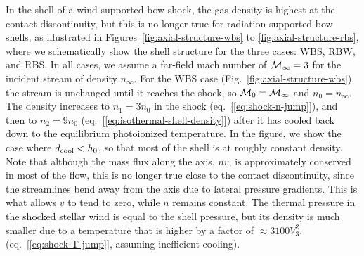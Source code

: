 In the shell of a wind-supported bow shock, the gas density is highest
at the contact discontinuity, but this is no longer true for
radiation-supported bow shells, as illustrated in
Figures~\ref{fig:axial-structure-wbs} to
\ref{fig:axial-structure-rbs}, where we schematically show the shell
structure for the three cases: WBS, RBW, and RBS.  In all cases, we
assume a far-field mach number of \(\mathcal{M}_\infty = 3\) for the incident stream
of density \(n_\infty\).  For the WBS case
(Fig.~\ref{fig:axial-structure-wbs}), the stream is unchanged until it
reaches the shock, so \(\mathcal{M}_0 = \mathcal{M}_\infty\) and \(n_0 = n_\infty\).  The density
increases to \(n_1 = 3 n_0\) in the shock
(eq.~[\ref{eq:shock-n-jump}]), and then to \(n_2 = 9 n_0\)
(eq.~[\ref{eq:isothermal-shell-density}]) after it has cooled back
down to the equilibrium photoionized temperature.  In the figure, we
show the case where \(d_{\text{cool}} < h_0\), so that most of the shell is at
roughly constant density.  Note that although the mass flux along the
axis, \(n v\), is approximately conserved in most of the flow, this is
no longer true close to the contact discontinuity, since the
streamlines bend away from the axis due to lateral pressure gradients.
This is what allows \(v\) to tend to zero, while \(n\) remains
constant.  The thermal pressure in the shocked stellar wind is equal
to the shell pressure, but its density is much smaller due to a
temperature that is higher by a factor of \(\approx 3100 V_3^2\),
(eq.~[\ref{eq:shock-T-jump}], assuming inefficient cooling).

